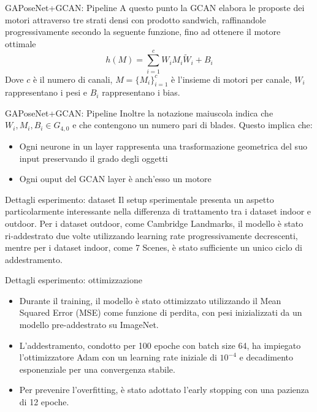 \begin{frame}{GAPoseNet+GCAN: Pipeline}
   A questo punto la GCAN elabora le proposte dei motori attraverso tre strati densi con prodotto sandwich, raffinandole progressivamente secondo la seguente funzione, fino ad ottenere il motore ottimale
   \[
      h(M) = \sum_{i=1}^{c} W_i M_i \tilde{W}_i + B_i
   \]
   Dove \(c\) è il numero di canali, \(M=\{M_i\}^{c}_{i=1}\) è l’insieme di motori per canale, \(W_i\) rappresentano i pesi e \(B_i\) rappresentano i bias.
\end{frame}

\begin{frame}{GAPoseNet+GCAN: Pipeline}
   Inoltre la notazione maiuscola indica che \(W_i, M_i,B_i \in G_{4,0}\) e che contengono un numero pari di blades. Questo implica che:
   \begin{itemize}
      \item Ogni neurone in un layer rappresenta una trasformazione geometrica del suo input preservando il grado degli oggetti 
      \item Ogni ouput del GCAN layer è anch’esso un motore 
   \end{itemize}
\end{frame}

\begin{frame}{Dettagli esperimento: dataset }
   Il setup sperimentale presenta un aspetto particolarmente interessante nella differenza di trattamento tra i dataset indoor e outdoor.
   Per i dataset outdoor, come Cambridge Landmarks, il modello è stato ri-addestrato due volte utilizzando learning rate progressivamente decrescenti, mentre per i dataset indoor, come 7 Scenes, è stato sufficiente un unico ciclo di addestramento. 
\end{frame}

\begin{frame}{Dettagli esperimento: ottimizzazione}
   \begin{itemize}
      \item Durante il training, il modello è stato ottimizzato utilizzando il Mean Squared Error (MSE) come funzione di perdita, con pesi inizializzati da un modello pre-addestrato su ImageNet. 
      \item L'addestramento, condotto per 100 epoche con batch size 64, ha impiegato l'ottimizzatore Adam con un learning rate iniziale di \(10^{-4}\) e decadimento esponenziale per una convergenza stabile. 
      \item Per prevenire l'overfitting, è stato adottato l’early stopping con una pazienza di 12 epoche.
   \end{itemize}
\end{frame}

